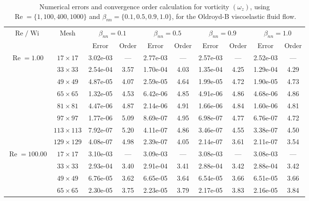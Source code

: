 \documentclass[preprint, 12pt]{elsarticle}
\begin{document}
{\begin{center}
\begin{table}[H]
\caption{Numerical errors and convergence order calculation for vorticity $(\omega_{z})$, using $\operatorname{Re}=\{1,100,400,1000\}$ and $\beta_{nn}=\{0.1,0.5,0.9,1.0\}$, for the Oldroyd-B viscoelastic fluid flow.\label{Appendix_tab_OldroydBWzWi5_10}}
\tiny{
    \begin{tabular*}{\textwidth}{@{\extracolsep\fill}cccccccccc@{}}
    \hline
    \multirow{2}{*}{$\operatorname{Re}/\operatorname{Wi}$} & \multirow{2}{*}{Mesh} & \multicolumn{2}{c}{$\beta_{nn}=0.1$}  & \multicolumn{2}{c}{$\beta_{nn}=0.5$}  & \multicolumn{2}{c}{$\beta_{nn}=0.9$}  & \multicolumn{2}{c}{$\beta_{nn}=1.0$}\\ %
     & & Error & Order & Error & Order & Error & Order & Error & Order \\
    \hline
    \multirow{7}{*}{$\operatorname{Re}=1.00$} & $17\times 17$ & 3.02e-03 & --- & 2.77e-03 & --- & 2.57e-03 & --- & 2.52e-03 & --- \\
    & $33\times 33$ & 2.54e-04 & 3.57 & 1.70e-04 & 4.03 & 1.35e-04 & 4.25 & 1.29e-04 & 4.29 \\
    & $49\times 49$ & 4.87e-05 & 4.07 & 2.59e-05 & 4.64 & 1.99e-05 & 4.72 & 1.90e-05 & 4.73 \\
    \multirow{3}{*}{$\operatorname{Wi}=5$} & $65\times 65$ & 1.32e-05 & 4.53 & 6.42e-06 & 4.85 & 4.91e-06 & 4.86 & 4.68e-06 & 4.86 \\
    & $81\times 81$ & 4.47e-06 & 4.87 & 2.14e-06 & 4.91 & 1.66e-06 & 4.84 & 1.60e-06 & 4.81 \\
    & $97\times 97$ & 1.77e-06 & 5.09 & 8.69e-07 & 4.95 & 6.98e-07 & 4.77 & 6.76e-07 & 4.72 \\
    & $113\times 113$ & 7.92e-07 & 5.20 & 4.11e-07 & 4.86 & 3.46e-07 & 4.55 & 3.38e-07 & 4.50 \\
    & $129\times 129$ & 4.08e-07 & 4.98 & 2.39e-07 & 4.05 & 2.14e-07 & 3.61 & 2.11e-07 & 3.54 \\
    \hline
    \multirow{7}{*}{$\operatorname{Re}=100.00$} & $17\times 17$ & 3.10e-03 & --- & 3.09e-03 & --- & 3.08e-03 & --- & 3.08e-03 & --- \\
    & $33\times 33$ & 2.93e-04 & 3.40 & 2.91e-04 & 3.41 & 2.88e-04 & 3.42 & 2.88e-04 & 3.42 \\
    & $49\times 49$ & 6.76e-05 & 3.62 & 6.65e-05 & 3.64 & 6.54e-05 & 3.66 & 6.51e-05 & 3.66 \\
    \multirow{3}{*}{$\operatorname{Wi}=5$} & $65\times 65$ & 2.30e-05 & 3.75 & 2.23e-05 & 3.79 & 2.17e-05 & 3.83 & 2.16e-05 & 3.84 \\

\end{tabular*}}
\end{table}
\end{center}}
\end{document}

